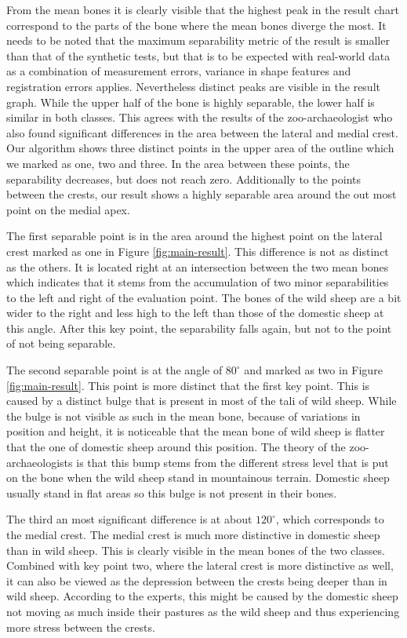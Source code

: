 \documentclass[pdftex,12pt,a4paper]{report}
\begin{document}
From the mean bones it is clearly visible that the highest peak in the result chart correspond to the parts of the bone where the mean bones diverge the most. It needs to be noted that the maximum separability metric of the result is smaller than that of the synthetic tests, but that is to be expected with real-world data as a combination of measurement errors, variance in shape features and registration errors applies. Nevertheless distinct peaks are visible in the result graph. While the upper half of the bone is highly separable, the lower half is similar in both classes. This agrees with the results of the zoo-archaeologist who also found significant differences in the area between the lateral and medial crest. Our algorithm shows three distinct points in the upper area of the outline which we marked as one, two and three. In the area between these points, the separability decreases, but does not reach zero. Additionally to the points between the crests, our result shows a highly separable area around the out most point on the medial apex.

The first separable point is in the area around the highest point on the lateral crest marked as one in Figure \ref{fig:main-result}. This difference is not as distinct as the others. It is located right at an intersection between the two mean bones which indicates that it stems from the accumulation of two minor separabilities to the left and right of the evaluation point. The bones of the wild sheep are a bit wider to the right and less high to the left than those of the domestic sheep at this angle. After this key point, the separability falls again, but not to the point of not being separable.

The second separable point is at the angle of $80^\circ$ and marked as two in Figure \ref{fig:main-result}. This point is more distinct that the first key point. This is caused by a distinct bulge that is present in most of the tali of wild sheep. While the bulge is not visible as such in the mean bone, because of variations in position and height, it is noticeable that the mean bone of wild sheep is flatter that the one of domestic sheep around this position. The theory of the zoo-archaeologists is that this bump stems from the different stress level that is put on the bone when the wild sheep stand in mountainous terrain. Domestic sheep usually stand in flat areas so this bulge is not present in their bones.

The third an most significant difference is at about $120^\circ$, which corresponds to the medial crest. The medial crest is much more distinctive in domestic sheep than in wild sheep. This is clearly visible in the mean bones of the two classes. Combined with key point two, where the lateral crest is more distinctive as well, it can also be viewed as the depression between the crests being deeper than in wild sheep. According to the experts, this might be caused by the domestic sheep not moving as much inside their pastures as the wild sheep and thus experiencing more stress between the crests.
\end{document}
